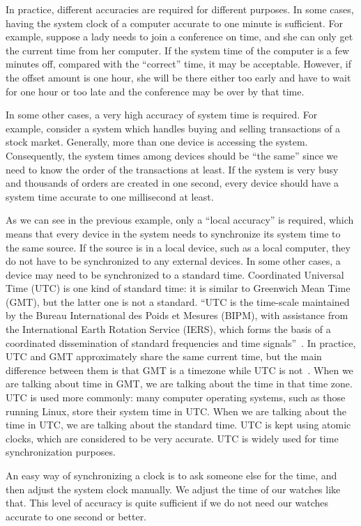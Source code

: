 In practice, different accuracies are required for different purposes. 
In some cases, having the system clock of a computer accurate to one
minute is sufficient. For example, suppose a lady needs to join a conference on
time, and she can only get the current time from her computer. If the system
time of the computer is a few minutes off, compared with the ``correct'' time,
it may be acceptable. However, if the offset amount is one hour, she will be
there either too early and have to wait for one hour or too late and the
conference may be over by that time.

In some other cases, a very high accuracy of system time is required. For
example, consider a system which handles buying and selling transactions of a
stock market.  Generally, more than one device is accessing the system.
Consequently, the system times among devices should be ``the same'' since we
need to know the order of the transactions at least. If the system is very busy
and thousands of orders are created in one second, every device should have a
system time accurate to one millisecond at least.

As we can see in the previous example, only a ``local accuracy'' is required,
which means that every device in the system needs to synchronize its system
time to the same source. If the source is in a local device, such as a local
computer, they do not
have to be synchronized to any external devices. In some other cases, a device
may need to be synchronized to a standard time. 
Coordinated Universal Time (UTC) is one kind of standard time: it is similar 
to Greenwich Mean Time (GMT), but the latter one is not a standard.
``UTC is the time-scale maintained by the Bureau International des Poids et
Mesures (BIPM), with assistance from the International Earth Rotation Service
(IERS), which forms the basis of a coordinated dissemination of standard
frequencies and time signals''~\cite{utc_def}.
In practice, UTC and GMT approximately share the same current time, but the
main difference
between them is that GMT is a timezone while UTC is not~\cite{utc}. When we are
talking about time in GMT\null, we are talking about the time in that time
zone.  UTC is used more commonly: many computer operating systems, such as
those running Linux, store their system time in UTC\null. When we are talking
about the time in UTC, we are talking about the standard time. UTC is kept
using atomic clocks, which are considered to be very accurate. UTC is widely
used for time synchronization purposes.

An easy way of synchronizing a clock is to ask someone else for the time, and
then adjust the system clock manually. We adjust the time of our
watches like that. This level of accuracy is quite sufficient if we do not need
our watches accurate to one second or better. 

